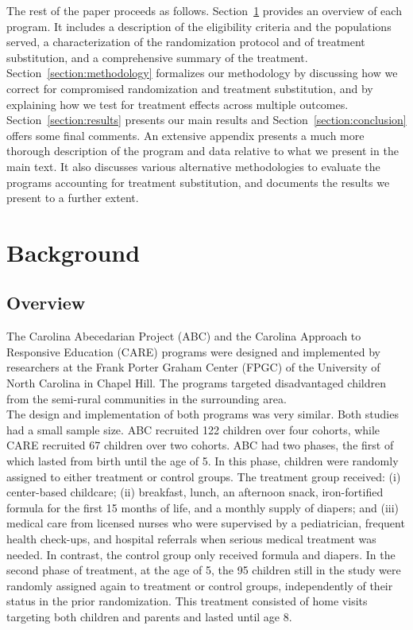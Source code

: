\noindent The rest of the paper proceeds as follows. Section~\ref{section:background} provides an overview of each program. It includes a description of the eligibility criteria and the populations served, a characterization of the randomization protocol and of treatment substitution, and a comprehensive summary of the treatment. Section~\ref{section:methodology} formalizes our methodology by discussing how we correct for compromised randomization and treatment substitution, and  by explaining how we test for treatment effects across multiple outcomes. Section~\ref{section:results} presents our main results and Section~\ref{section:conclusion} offers some final comments. An extensive appendix presents a much more thorough description of the program and data relative to what we present in the main text. It also discusses various alternative methodologies to evaluate the programs accounting for treatment substitution, and documents the results we present to a further extent.

\section{Background} \label{section:background}
\subsection{Overview}

\noindent The Carolina Abecedarian Project (ABC) and the Carolina Approach to Responsive Education (CARE) programs were designed and implemented by researchers at the Frank Porter Graham Center (FPGC) of the University of North Carolina in Chapel Hill. The programs targeted disadvantaged children from the semi-rural communities in the surrounding area.\\

\noindent The design and implementation of both programs was very similar. Both studies had a small sample size. ABC recruited 122 children over four cohorts, while CARE recruited 67 children over two cohorts. ABC had two phases, the first of which lasted from birth until the age of 5. In this phase, children were randomly assigned to either treatment or control groups. The treatment group received: (i) center-based childcare; (ii) breakfast, lunch, an afternoon snack, iron-fortified formula for the first 15 months of life, and a monthly supply of diapers; and (iii) medical care from licensed nurses who were supervised by a pediatrician, frequent health check-ups, and hospital referrals when serious medical treatment was needed. In contrast, the control group only received formula and diapers. In the second phase of treatment, at the age of 5, the 95 children still in the study were randomly assigned again to treatment or control groups, independently of their status in the prior randomization. This treatment consisted of home visits targeting both children and parents and lasted until age 8.\\ 

